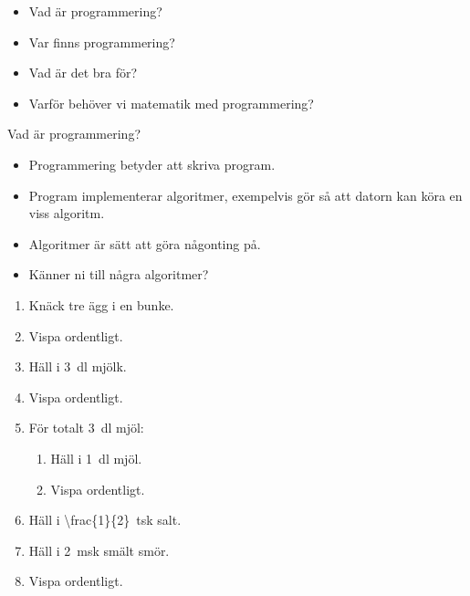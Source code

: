 
\begin{frame}
  \begin{question}
    \begin{itemize}
      \item Vad är programmering?
      \item Var finns programmering?
      \item Vad är det bra för?
      \item Varför behöver vi matematik med programmering?
    \end{itemize}
  \end{question}
\end{frame}

\begin{frame}
  \begin{block}{Vad är programmering?}
    \begin{itemize}
      \item Programmering betyder att skriva program.
      \item Program implementerar algoritmer, exempelvis gör så att datorn kan 
        köra en viss algoritm.
      \item Algoritmer är sätt att göra någonting på.
    \end{itemize}
  \end{block}

  \pause

  \begin{exercise}
    \begin{itemize}
      \item Känner ni till några algoritmer?
    \end{itemize}
  \end{exercise}
\end{frame}

\begin{frame}
  \begin{example}
    \begin{enumerate}
      \item Knäck tre ägg i en bunke.
      \item Vispa ordentligt.
      \item Häll i \SI{3}{\deci\litre} mjölk.
      \item Vispa ordentligt.
      \item För totalt \SI{3}{\deci\litre} mjöl:
        \begin{enumerate}
          \item Häll i \SI{1}{\deci\litre} mjöl.
          \item Vispa ordentligt.
        \end{enumerate}
      \item Häll i \SI{\frac{1}{2}}{tsk} salt.
      \item Häll i \SI{2}{msk} smält smör.
      \item Vispa ordentligt.
    \end{enumerate}
  \end{example}
\end{frame}

